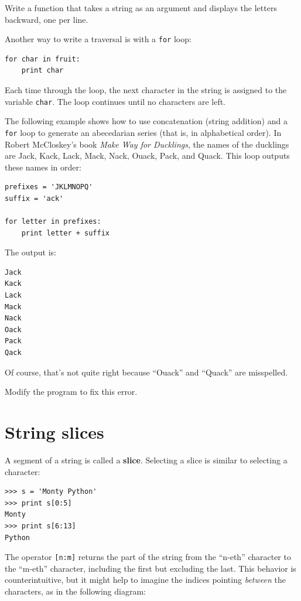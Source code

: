 \documentclass[10pt]{book}
\begin{document}
\begin{ex}
Write a function that takes a string as an argument
and displays the letters backward, one per line.
\end{ex}

Another way to write a traversal is with a {\tt for} loop:

\beforeverb
\begin{verbatim}
for char in fruit:
    print char
\end{verbatim}
\afterverb
%
Each time through the loop, the next character in the string is assigned
to the variable {\tt char}.  The loop continues until no characters are
left.


The following example shows how to use concatenation (string addition)
and a {\tt for} loop to generate an abecedarian series (that is, in
alphabetical order).  In Robert McCloskey's book {\em Make
Way for Ducklings}, the names of the ducklings are Jack, Kack, Lack,
Mack, Nack, Ouack, Pack, and Quack.  This loop outputs these names in
order:

\beforeverb
\begin{verbatim}
prefixes = 'JKLMNOPQ'
suffix = 'ack'

for letter in prefixes:
    print letter + suffix
\end{verbatim}
\afterverb
%
The output is:

\beforeverb
\begin{verbatim}
Jack
Kack
Lack
Mack
Nack
Oack
Pack
Qack
\end{verbatim}
\afterverb
%
Of course, that's not quite right because ``Ouack'' and
``Quack'' are misspelled.

\begin{ex}
Modify the program to fix this error.
\end{ex}



\section{String slices}
\label{slice}


A segment of a string is called a {\bf slice}.  Selecting a slice is
similar to selecting a character:

\beforeverb
\begin{verbatim}
>>> s = 'Monty Python'
>>> print s[0:5]
Monty
>>> print s[6:13]
Python
\end{verbatim}
\afterverb
%
The operator {\tt [n:m]} returns the part of the string from the 
``n-eth'' character to the ``m-eth'' character, including the first but
excluding the last.  This behavior is counterintuitive, but it might
help to imagine the indices pointing {\em between} the
characters, as in the following diagram:
\end{document}
